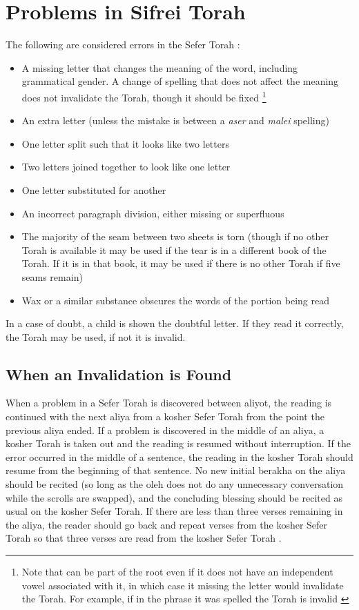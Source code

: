 \chapter{Problems in Sifrei Torah}	
The following are considered errors in the Sefer Torah \parencite[24:1]{Kitzur}:
\begin{itemize}
	\item A missing letter that changes the meaning of the word, including grammatical gender. A change of spelling that does not affect the meaning does not invalidate the Torah, though it should be fixed \footnote{Note that can be part of the root even if it does not have an independent vowel associated with it, in which case it missing the letter would invalidate the Torah.  For example, if in the phrase  it was spelled  the Torah is invalid \parencite*[24:1]{Kitzur}}
	\item An extra letter (unless the mistake is between a \textit{\heth aser} and \textit{malei} spelling)
	\item One letter split such that it looks like two letters
	\item Two letters joined together to look like one letter
	\item One letter substituted for another
	\item An incorrect paragraph division, either missing or superfluous
	\item The majority of the seam between two sheets is torn (though if no other Torah is available it may be used if the tear is in a different book of the Torah.  If it is in that book, it may be used if there is no other Torah if five seams remain)
	\item Wax or a similar substance obscures the words of the portion being read
\end{itemize}

In a case of doubt, a child is shown the doubtful letter.  If they read it correctly, the Torah may be used, if not it is invalid.

\section{When an Invalidation is Found}


When a problem in a Sefer Torah is discovered between aliyot, the reading is continued with the next aliya from a kosher Sefer Torah from the point the previous aliya ended. If a problem is discovered in the middle of an aliya, a kosher Torah is taken out and the reading is resumed without interruption. If the error occurred in the middle of a sentence, the reading in the kosher Torah should resume from the beginning of that sentence.  No new initial berakha on the aliya should be recited (so long as the oleh does not do any unnecessary conversation while the scrolls are swapped), and the concluding blessing should be recited as usual on the kosher Sefer Torah. If there are less than three verses remaining in the aliya, the reader should go back and repeat verses from the kosher Sefer Torah so that three verses are read from the kosher Sefer Torah \parencite*[24:8]{Kitzur}.

